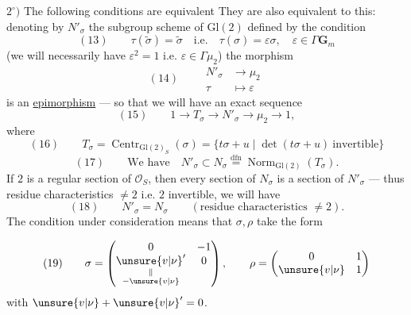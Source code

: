 $2^\circ)$ The following conditions are equivalent
\diagram{\[
(12)\quad\left\{
\begin{tikzcd}[ampersand replacement=\&,column sep=large,row sep=large]
\boxed{\operatorname{Tr}\sigma=0}\arrow[r,Leftrightarrow]\arrow[d,Leftrightarrow]\&\operatorname{Tr}\rho=1\arrow[r,Leftrightarrow]\arrow[d,Leftrightarrow]\&\boxed{\widetilde\sigma^2=1}\arrow[d,Leftrightarrow]\\
\deleted{\mathrm{Tr}}\boxed{\unsure{w|\omega}'=0}\&\boxed{\unsure{w|\omega}=1}\&\sigma^2\in\Gamma\mathbf G_m\arrow[d,Leftrightarrow]\\
\&\&\boxed{\sigma^2=\unsure{v|\nu}\,\mathrm{id}.}
\end{tikzcd}\right.
\]}
They are also equivalent to this: denoting by $N'_\sigma$ the subgroup scheme of $\mathrm{Gl}(2)$ defined by the condition
\[
(13)\qquad \tau(\widetilde\sigma)=\widetilde\sigma\quad\text{i.e.}\quad\tau(\sigma)=\varepsilon\sigma,\quad\varepsilon\in\Gamma\mathbf G_m
\]
(we will necessarily have $\varepsilon^2=1$ i.e. $\varepsilon\in\Gamma\mu_2$)
the morphism
\[
(14)\qquad\begin{aligned}N'_\sigma&\longrightarrow\mu_2\\\tau&\longmapsto\varepsilon\end{aligned}
\]
is an \uline{epimorphism} --- so that we will have an exact sequence
\[
(15)\qquad1\longrightarrow T_\sigma\longrightarrow N'_\sigma\longrightarrow\mu_2\longrightarrow1,
\]
where 
\[
(16)\qquad T_\sigma=\operatorname{Centr}_{\mathrm{Gl}(2)_S}(\sigma)=\{t\sigma+u\mid\det(t\sigma+u)\ \text{invertible}\}
\]
\[
(17)\qquad\text{We have}\quad N'_\sigma\subset N_\sigma\overset{\mathrm{dfn}}=\operatorname{Norm}_{\mathrm{Gl}(2)}(T_\sigma).
\]
If $2$ is a regular section of $\mathcal O_S$, then every section of $N_\sigma$  is a section of $N'_\sigma$ --- thus   residue characteristics  $\ne2$ i.e. $2$ invertible, we will have
\[
(18)\qquad N'_\sigma=N_\sigma\qquad(\text{residue characteristics }\ne2).
\]
The condition under consideration means that $\sigma,\rho$ take the form

\[
(19)\qquad\sigma=\begin{pmatrix}0&-1\\\underset{\substack{\Vert\\-\unsure{v|\nu}}}{\unsure{v|\nu}'}&0\end{pmatrix},\qquad\rho=\begin{pmatrix}0&1\\\unsure{v|\nu}&1\end{pmatrix}
\]
with $\unsure{v|\nu}+\unsure{v|\nu}'=0$.

